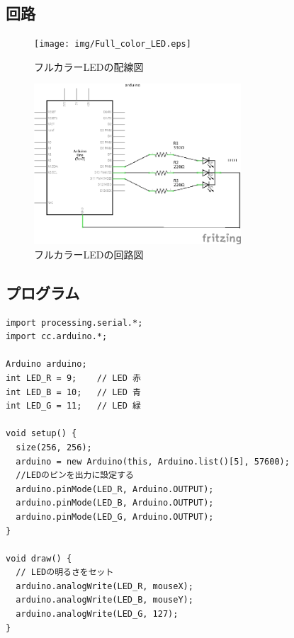 \documentclass[11pt,a4paper]{jarticle}
\begin{document}
\subsection*{回路}
\begin{figure}[h!]
 \begin{minipage}{0.5\columnwidth}
  \centering
  \texttt{[image: img/Full\_color\_LED.eps]}
  \caption{フルカラーLEDの配線図}
  \label{circuit}
 \end{minipage}
 \begin{minipage}{0.5\columnwidth}
  \centering
  \includegraphics[height=60mm]{img/Full_color_LED_circuit.eps}
  \caption{フルカラーLEDの回路図}
 \end{minipage}
\end{figure}

\subsection*{プログラム}
\begin{lstlisting}
import processing.serial.*;
import cc.arduino.*;
 
Arduino arduino;
int LED_R = 9;    // LED 赤
int LED_B = 10;   // LED 青
int LED_G = 11;   // LED 緑

void setup() {
  size(256, 256);
  arduino = new Arduino(this, Arduino.list()[5], 57600);
  //LEDのピンを出力に設定する
  arduino.pinMode(LED_R, Arduino.OUTPUT);
  arduino.pinMode(LED_B, Arduino.OUTPUT);
  arduino.pinMode(LED_G, Arduino.OUTPUT);
}

void draw() {
  // LEDの明るさをセット
  arduino.analogWrite(LED_R, mouseX);
  arduino.analogWrite(LED_B, mouseY);
  arduino.analogWrite(LED_G, 127);
}
\end{lstlisting}
\end{document}
